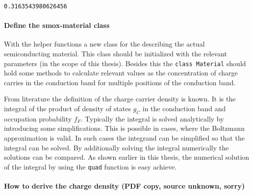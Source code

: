 \documentclass[11pt]{article}
\begin{document}
    \begin{Verbatim}[commandchars=\\\{\}]
0.3163543980626456
    \end{Verbatim}

    \hypertarget{define-the-smox-material-class}{%
\paragraph{Define the smox-material
class}\label{define-the-smox-material-class}}

With the helper functions a new class for the describing the actual
semiconducting material. This class should be initialized with the
relevant parameters (in the scope of this thesis). Besides this the
\texttt{class\ Material} should hold some methods to calculate relevant
values as the concentration of charge carries in the conduction band for
multiple positions of the conduction band.

From literature the definition of the charge carrier density is known.
It is the integral of the product of density of states \(g_C\) in the
conduction band and occupation probability \(f_F\). Typically the
integral is solved analytically by introducing some simplifications.
This is possible in cases, where the Boltzmann approximation is valid.
In such cases the integrand can be simplified so that the integral can
be solved. By additionally solving the integral numerically the
solutions can be compared. As shown earlier in this thesis, the
numerical solution of the integral by using the \texttt{quad} function
is easy achieve.

    \hypertarget{how-to-derive-the-charge-density-pdf-copy-source-unknown-sorry}{%
\paragraph{How to derive the charge density (PDF copy, source unknown,
sorry)}\label{how-to-derive-the-charge-density-pdf-copy-source-unknown-sorry}}
\end{document}
